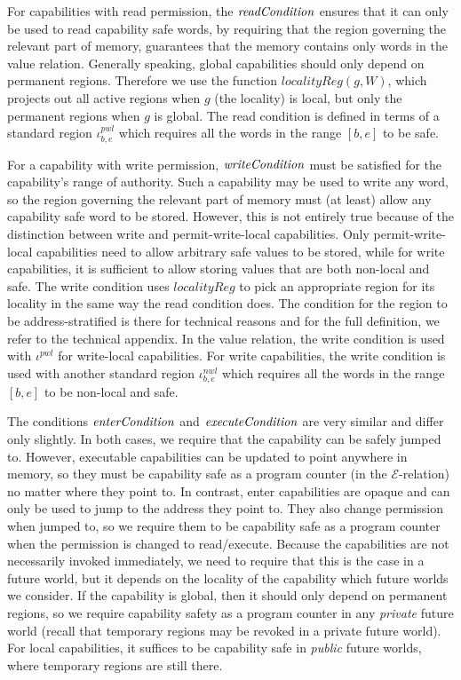\documentclass[compsoc,conference,letterpaper,fleqn]{IEEEtran}
\newcommand{\var}[1]{\mathit{#1}}
\newcommand{\gl}{\var{g}}
\newcommand{\start}{\var{b}}
\newcommand{\addrend}{\var{e}}
\newcommand{\nwl}{\var{nwl}}
\newcommand{\pwl}{\var{pwl}}
\newcommand{\plainfun}[2]{
  \ifthenelse{\equal{#2}{}}
  {\mathit{#1}}
  {\mathit{#1}(#2)}
}
\newcommand{\readCond}[1]{\plainfun{readCondition}{#1}}
\newcommand{\writeCond}[1]{\plainfun{writeCondition}{#1}}
\newcommand{\execCond}[1]{\plainfun{executeCondition}{#1}}
\newcommand{\entryCond}[1]{\plainfun{enterCondition}{#1}}
\newcommand{\asmType}{\plaindom{AsmType}}
\newcommand{\plaindom}[1]{\mathrm{#1}}
\newcommand{\intr}[2]{\mathcal{#1}}
\newcommand{\exprintr}[1]{\intr{E}{#1}}
\newcommand{\stder}{\exprintr{\asmType}}
\begin{document}
For capabilities with read permission, the $\readCond{}$ ensures that it can
only be used to read capability safe words, by requiring that the region
governing the relevant part of memory, guarantees that the memory contains only
words in the value relation. Generally speaking, global capabilities should only
depend on permanent regions. Therefore we use the function
$\var{localityReg}(\gl,W)$, which projects out all active regions when
$\gl$ (the locality) is local, but only the permanent regions when $\gl$ is global.
The read condition is defined in terms of a standard region
$\iota^\pwl_{\start,\addrend}$ which requires all the words in the range
$[\start,\addrend]$ to be safe.

For a capability with write permission, $\writeCond{}$ must be
satisfied for the capability's range of authority. Such a capability
may be used to write any word, so the region governing the relevant
part of memory must (at least) allow any capability safe word to be
stored. However, this is not entirely true because of the distinction
between write and permit-write-local capabilities.  Only
permit-write-local capabilities need to allow arbitrary safe values to
be stored, while for write capabilities, it is sufficient to allow
storing values that are both non-local and safe. The write condition
uses $\var{localityReg}$ to pick an appropriate region for its
locality in the same way the read condition does. The condition for
the region to be address-stratified is there for technical reasons and for the full definition, we refer to the technical appendix. In
the value relation, the write condition is used with $\iota^\pwl$ for
write-local capabilities. For write capabilities, the write condition
is used with another standard region $\iota^\nwl_{\start,\addrend}$
which requires all the words in the range $[\start,\addrend]$ to be
non-local and safe.

The conditions $\entryCond{}$ and $\execCond{}$ are very similar and differ only
slightly. In both cases, we require that the capability can be safely jumped to.
However, executable capabilities can be updated to point anywhere in memory, so
they must be capability safe as a program counter (in the $\stder$-relation) no
matter where they point to. In contrast, enter capabilities are opaque and can
only be used to jump to the address they point to. They also change permission
when jumped to, so we require them to be capability safe as a program counter
when the permission is changed to read/execute. Because the capabilities are not
necessarily invoked immediately, we need to require that this is the case in a
future world, but it depends on the locality of the capability which future
worlds we consider. If the capability is global, then it should only depend on
permanent regions, so we require capability safety as a program counter in any
\emph{private} future world (recall that temporary regions may be revoked in a
private future world). For local capabilities, it suffices to be capability safe
in \emph{public} future worlds, where temporary regions are still there.
\end{document}

